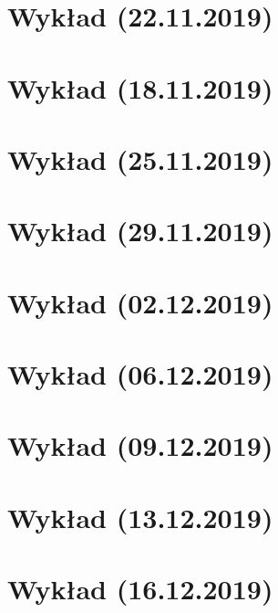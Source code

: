 \documentclass[a5]{article}
\begin{document}
\section{Wykład (22.11.2019)}

\pagebreak
\section{Wykład (18.11.2019)}

\pagebreak
\section{Wykład (25.11.2019)}

\pagebreak
\section{Wykład (29.11.2019)}

\pagebreak
\section{Wykład (02.12.2019)}

\pagebreak
\section{Wykład (06.12.2019)}

\pagebreak
\section{Wykład (09.12.2019)}

\pagebreak
\section{Wykład (13.12.2019)}

\pagebreak
\section{Wykład (16.12.2019)}

\end{document}
